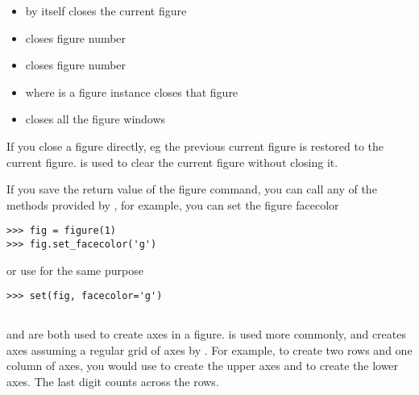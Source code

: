 \documentclass[twoside]{book}
\begin{document}
\begin{itemize}

  \item {} by itself closes the current figure

  \item {} closes figure number 

  \item {} closes figure number 
    
  \item {} where  is a figure instance closes
    that figure

  \item {} closes all the figure windows

\end{itemize}
    
\noindent If you close a figure directly, eg  the
previous current figure is restored to the current figure. 
is used to clear the current figure without closing it.

If you save the return value of the figure command, you can call any
of the methods provided by , for
example, you can set the figure facecolor

\begin{lstlisting}
>>> fig = figure(1)
>>> fig.set_facecolor('g')
\end{lstlisting}

or use  for the same purpose

\begin{lstlisting}
>>> set(fig, facecolor='g')
\end{lstlisting}

\subsection{}
\label{sec:subplot}

 and  are both used to create axes in a
figure.   is used more commonly, and creates axes
assuming a  regular grid of axes  by .
For example, to create two rows and one column of axes, you would use
 to create the upper axes and 
to create the lower axes.  The last digit counts across the rows.

\end{document}
